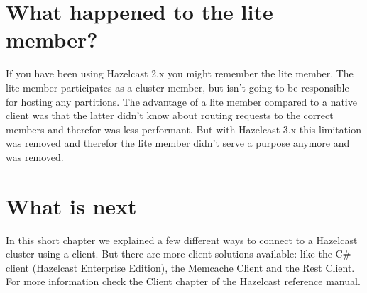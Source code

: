 \section{What happened to the lite member?}
If you have been using Hazelcast 2.x you might remember the lite member. The lite member participates as a cluster member, but isn't going to be responsible for hosting any partitions. The advantage of a lite member compared to a native client was that the latter didn't know about routing requests to the correct members and therefor was less performant. But with Hazelcast 3.x this limitation was removed and therefor the lite member didn't serve a purpose anymore and was removed.

\section{What is next}
In this short chapter we explained a few different ways to connect to a Hazelcast cluster using a client. But there are more client solutions available: like the C\# client (Hazelcast Enterprise Edition), the Memcache Client and the Rest Client. For more information check the Client chapter of the Hazelcast reference manual.
